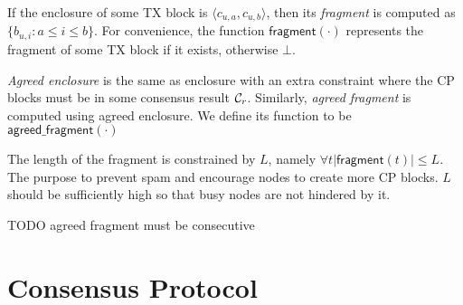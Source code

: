 If the enclosure of some TX block is $\langle c_{u,a}, c_{u, b} \rangle$,
then its \emph{fragment} is computed as $\{ b_{u, i} : a \le i \le b \}$.
For convenience, the function $\textsf{fragment}(\cdot)$ represents the fragment of some TX block if it exists, otherwise $\bot$.

\emph{Agreed enclosure} is the same as enclosure with an extra constraint where the CP blocks must be in some consensus result $\mathcal{C}_r$.
Similarly, \emph{agreed fragment} is computed using agreed enclosure.
We define its function to be $\textsf{agreed\_fragment}(\cdot)$

The length of the fragment is constrained by $L$,
namely $\forall t |\textsf{fragment}(t)| \le L$.
The purpose to prevent spam and encourage nodes to create more CP blocks.
$L$ should be sufficiently high so that busy nodes are not hindered by it.

TODO agreed fragment must be consecutive

\section{Consensus Protocol}
\label{sec:cons-protocol}

